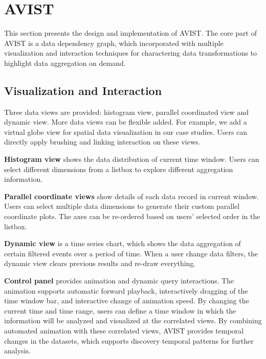

\section{AVIST}
This section presents the design and implementation of AVIST. The core part of AVIST is a data dependency graph, which incorporated with multiple visualization and interaction techniques for charactering data transformations to highlight data aggregation on demand.  

 
\subsection{Visualization and Interaction}




Three data views are provided: histogram view, parallel coordinated view and dynamic view. More data views can be flexible added. For example, we add a virtual globe view for spatial data visualization in our case studies. Users can directly apply brushing and linking interaction on these views. 

\textbf{Histogram view} shows the data distribution of  current time window. Users can select different dimensions  from a listbox to explore different aggregation information.

\textbf{Parallel coordinate views} show  details of each data record in current window. Users can select multiple data dimensions to generate their custom parallel coordinate plots. The axes can be re-ordered based on users' selected order in the listbox.

\textbf{Dynamic view} is a time series  chart, which shows the data aggregation of certain filtered events over a period of time. When a user change data filters, the dynamic view clears previous results and re-draw everything. 

\textbf{Control panel} provides animation and dynamic query interactions.
The animation supports automatic forward playback, interactively dragging of the time window bar, and interactive change of animation speed. By changing the current time and time range, users can define a time window in which the information will be analyzed and visualized at the correlated views. By combining automated animation with these correlated views, AVIST provides  temporal changes in the datasets, which supports  discovery temporal patterns for further analysis.

